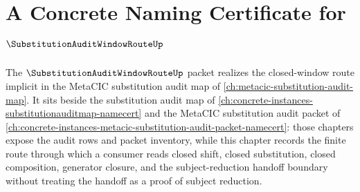 \chapter{A Concrete Naming Certificate for $\SubstitutionAuditWindowRouteUp$}
\label{ch:concrete-instances-substitutionauditwindowroute-namecert}

The $\SubstitutionAuditWindowRouteUp$ packet realizes the closed-window route implicit in the MetaCIC substitution audit map of \autoref{ch:metacic-substitution-audit-map}. It sits beside the substitution audit map of \autoref{ch:concrete-instances-substitutionauditmap-namecert} and the MetaCIC substitution audit packet of \autoref{ch:concrete-instances-metacic-substitution-audit-packet-namecert}: those chapters expose the audit rows and packet inventory, while this chapter records the finite route through which a consumer reads closed shift, closed substitution, closed composition, generator closure, and the subject-reduction handoff boundary without treating the handoff as a proof of subject reduction.

